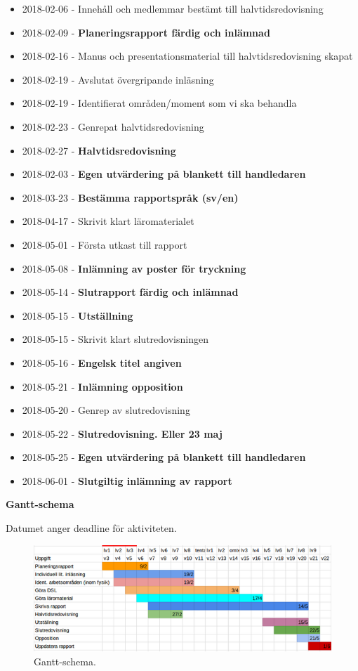 \documentclass[12pt,a4paper]{article}
\begin{document}
\begin{itemize}
    \item 2018-02-06 - Innehåll och medlemmar bestämt till halvtidsredovisning
    \item 2018-02-09 - \textbf{Planeringsrapport färdig och inlämnad}
    \item 2018-02-16 - Manus och presentationsmaterial till halvtidsredovisning skapat
    \item 2018-02-19 - Avslutat övergripande inläsning
    \item 2018-02-19 - Identifierat områden/moment som vi ska behandla
    \item 2018-02-23 - Genrepat halvtidsredovisning
    \item 2018-02-27 - \textbf{Halvtidsredovisning}
    \item 2018-02-03 - \textbf{Egen utvärdering på blankett till handledaren}
    \item 2018-03-23 - \textbf{Bestämma rapportspråk (sv/en)}
    \item 2018-04-17 - Skrivit klart läromaterialet
    \item 2018-05-01 - Första utkast till rapport
    \item 2018-05-08 - \textbf{Inlämning av poster för tryckning}
    \item 2018-05-14 - \textbf{Slutrapport färdig och inlämnad}
    \item 2018-05-15 - \textbf{Utställning}
    \item 2018-05-15 - Skrivit klart slutredovisningen
    \item 2018-05-16 - \textbf{Engelsk titel angiven}
    \item 2018-05-21 - \textbf{Inlämning opposition}
    \item 2018-05-20 - Genrep av slutredovisning
    \item 2018-05-22 - \textbf{Slutredovisning. Eller 23 maj}
    \item 2018-05-25 - \textbf{Egen utvärdering på blankett till handledaren}
    \item 2018-06-01 - \textbf{Slutgiltig inlämning av rapport}
\end{itemize}

\textbf{Gantt-schema}

Datumet anger deadline för aktiviteten.

\begin{figure}[H]
  \includegraphics[width=\linewidth]{gantt.png}
  \caption{Gantt-schema.}
  \label{fig:gantt}
\end{figure}
\end{document}

